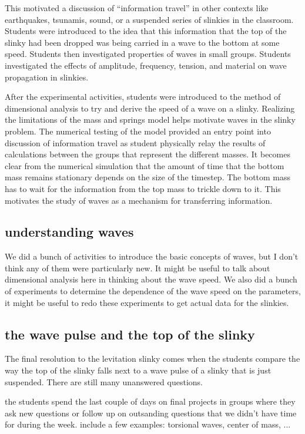 \documentclass[aps,pre,10pt,superscriptaddress,showpacs,amsmath,amssymb,nofootinbib]{revtex4-1}
\begin{document}
This motivated a discussion of ``information travel'' in other contexts like earthquakes, tsunamis, 
sound, or a suspended series of slinkies in the classroom. Students were introduced to the idea that
this information that the top of the slinky had been dropped was being carried in a wave to the bottom
at some speed. Students then investigated properties of waves in small groups. Students investigated the
effects of amplitude, frequency, tension, and material on wave propagation in slinkies.

After the experimental activities, students were introduced to the method of dimensional analysis
to try and derive the speed of a wave on a slinky.
Realizing the limitations of the  mass and springs model helps motivate waves in
the slinky problem.  The numerical testing of the model provided an entry point
into discussion of information travel as student  physically relay the results
of calculations between the groups that represent the different masses.  It
becomes clear from the numerical simulation that the amount of time that the
bottom mass remains stationary depends on the size of the timestep.  The bottom
mass has to wait for the information from the top mass to trickle down to it. 
This motivates the study of waves as a mechanism for transferring information.

\subsection{understanding waves}
 We did a bunch of activities to introduce the basic concepts of waves, but I
 don't think any of them were particularly new.  It might be useful to talk about
dimensional analysis here in thinking about the wave speed.  We also did
a bunch of experiments to determine the dependence of the wave speed on
the parameters, it might be useful to redo these experiments to get actual data
for the slinkies.

\subsection{the wave pulse and the top of the slinky }
The final resolution to the levitation slinky comes when the students compare
the way the top of the slinky falls next to a wave pulse of a slinky that is
just suspended.  There are still many unanswered questions.

the students spend the last couple of days on final projects in groups where
they ask new questions or follow up on outsanding questions that we didn't have
time for during the week. include a few examples: torsional waves, center of 
mass, ...
\end{document}
